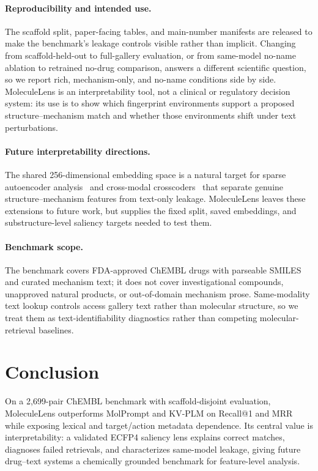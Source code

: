 \documentclass{article}
\begin{document}
\paragraph{Reproducibility and intended use.}
The scaffold split, paper-facing tables, and main-number manifests are released to make the benchmark's leakage controls visible rather than implicit. Changing from scaffold-held-out to full-gallery evaluation, or from same-model no-name ablation to retrained no-drug comparison, answers a different scientific question, so we report rich, mechanism-only, and no-name conditions side by side. MoleculeLens is an interpretability tool, not a clinical or regulatory decision system: its use is to show which fingerprint environments support a proposed structure--mechanism match and whether those environments shift under text perturbations.

\paragraph{Future interpretability directions.}
The shared 256-dimensional embedding space is a natural target for sparse autoencoder analysis~\citep{templeton2024monosemanticity,bricken2023monosemanticity} and cross-modal crosscoders~\citep{lindsey2025attribution} that separate genuine structure--mechanism features from text-only leakage. MoleculeLens leaves these extensions to future work, but supplies the fixed split, saved embeddings, and substructure-level saliency targets needed to test them.

\paragraph{Benchmark scope.}
The benchmark covers FDA-approved ChEMBL drugs with parseable SMILES and curated mechanism text; it does not cover investigational compounds, unapproved natural products, or out-of-domain mechanism prose. Same-modality text lookup controls access gallery text rather than molecular structure, so we treat them as text-identifiability diagnostics rather than competing molecular-retrieval baselines.

\section{Conclusion}

On a 2,699-pair ChEMBL benchmark with scaffold-disjoint evaluation, MoleculeLens outperforms MolPrompt and KV-PLM on Recall@1 and MRR while exposing lexical and target/action metadata dependence. Its central value is interpretability: a validated ECFP4 saliency lens explains correct matches, diagnoses failed retrievals, and characterizes same-model leakage, giving future drug--text systems a chemically grounded benchmark for feature-level analysis.
\end{document}
